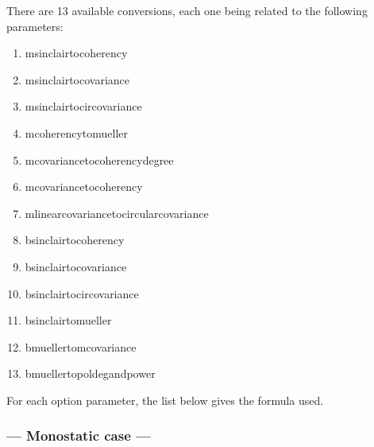 There are 13 available conversions, each one being related to the following  parameters:
\begin{enumerate}
\item msinclairtocoherency
\item msinclairtocovariance
\item msinclairtocircovariance
\item mcoherencytomueller
\item mcovariancetocoherencydegree
\item mcovariancetocoherency
\item mlinearcovariancetocircularcovariance
\item bsinclairtocoherency
\item bsinclairtocovariance
\item bsinclairtocircovariance
\item bsinclairtomueller
\item bmuellertomcovariance
\item bmuellertopoldegandpower
\end{enumerate}

For each option parameter, the list below gives the formula used.

\subsubsection{--- Monostatic case ---}

